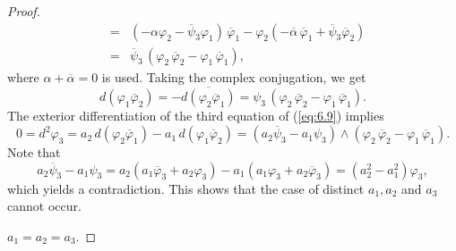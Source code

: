 \documentclass{amsart}
\numberwithin{equation}{section}
\theoremstyle{definition}
\renewcommand{\1}{\mathds{1}}
\renewcommand{\>}{\rightarrow}
\begin{document}
\begin{proof}
\begin{eqnarray*}
 & = & (-\alpha \varphi_2 - \overline{\psi}_3 \varphi_1 )\,\overline{\varphi}_1 - \varphi_2 (-\overline{\alpha} \,\overline{\varphi}_1 +  \overline{\psi}_3 \overline{\varphi}_2 ) \\
 & = &  \overline{\psi}_3 \,( \varphi_2 \,\overline{\varphi}_2 - \varphi_1\,\overline{\varphi}_1),
\end{eqnarray*}
where $\alpha + \overline{\alpha} =0$ is used. Taking the complex conjugation, we get
$$  d(\varphi_1 \overline{\varphi}_2 ) = -  \overline{ d(\varphi_2 \overline{\varphi}_1 )} =  \psi_3 \, ( \varphi_2 \,\overline{\varphi}_2 - \varphi_1\,\overline{\varphi}_1) .$$
The exterior differentiation of the third equation of (\ref{eq:6.9}) implies
$$ 0 = d^2\varphi_3 = a_2 \,d (\varphi_2 \overline{\varphi}_1) - a_1 \,d(\varphi_1 \overline{\varphi}_2) = (a_2\overline{\psi}_3 - a_1\psi_3) \wedge (\varphi_2 \,\overline{\varphi}_2 - \varphi_1\,\overline{\varphi}_1) .$$
Note that
$$ a_2\overline{\psi}_3 - a_1\psi_3 = a_2(a_1 \overline{\varphi}_3 + a_2 \varphi_3) - a_1 (a_1 \varphi_3 + a_2 \overline{\varphi}_3 ) = (a_2^2-a_1^2) \varphi_3, $$
which yields a contradiction. This shows that the case of distinct $a_1, a_2$ and $a_3$ cannot occur.
\vspace{0.15cm}

 $a_1=a_2=a_3$.


\end{proof}
\end{document}
